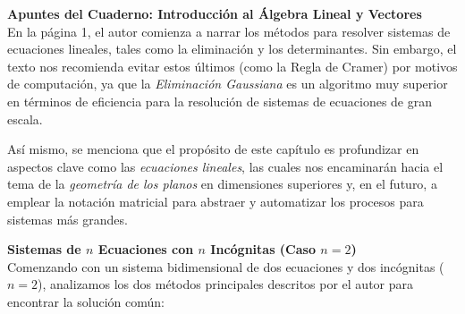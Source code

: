 \documentclass[11pt, a4paper]{article}
\begin{document}
\noindent\textbf{Apuntes del Cuaderno: Introducción al Álgebra Lineal y Vectores}\\[0.5em]

En la página 1, el autor comienza a narrar los métodos para resolver sistemas de ecuaciones lineales, tales como la eliminación y los determinantes. Sin embargo, el texto nos recomienda evitar estos últimos (como la Regla de Cramer) por motivos de computación, ya que la \textit{Eliminación Gaussiana} es un algoritmo muy superior en términos de eficiencia para la resolución de sistemas de ecuaciones de gran escala.

Así mismo, se menciona que el propósito de este capítulo es profundizar en aspectos clave como las \textit{ecuaciones lineales}, las cuales nos encaminarán hacia el tema de la \textit{geometría de los planos} en dimensiones superiores y, en el futuro, a emplear la notación matricial para abstraer y automatizar los procesos para sistemas más grandes.

\noindent\textbf{Sistemas de $n$ Ecuaciones con $n$ Incógnitas (Caso $n=2$)}\\[0.5em]
Comenzando con un sistema bidimensional de dos ecuaciones y dos incógnitas ($n=2$), analizamos los dos métodos principales descritos por el autor para encontrar la solución común:
\end{document}
